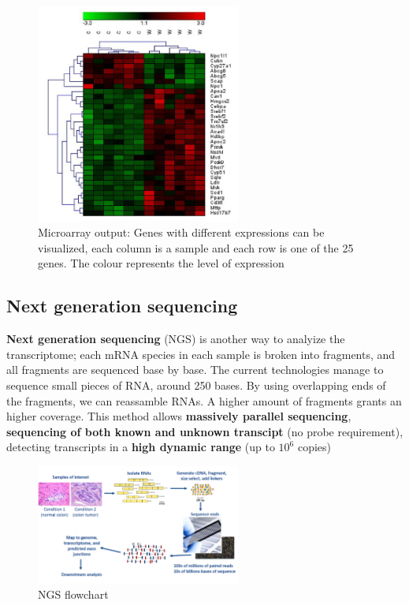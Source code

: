       \begin{figure}[h]
      \caption{Microarray output: Genes with different expressions can be visualized, each column is a sample and each row is one of the 25 genes. The colour represents the level of expression}
      \centering
      \includegraphics[width=0.6\textwidth]{MicroRNAresults.PNG}
      \end{figure}

    \subsection{Next generation sequencing}
      \textbf{Next generation sequencing} (NGS) is another way to analyize the transcriptome; each mRNA species in each sample is broken into fragments, and all fragments are sequenced base by base. The current technologies manage to sequence small pieces of RNA, around 250 bases. By using overlapping ends of the fragments, we can reassamble RNAs. A higher amount of fragments grants an higher coverage. This method allows \textbf{massively parallel sequencing}, \textbf{sequencing of both known and unknown transcipt} (no probe requirement), detecting transcripts in a \textbf{high dynamic range} (up to $10^6$ copies)

      \begin{figure}[h]
      \caption{NGS flowchart}
      \centering
      \includegraphics[width=0.6\textwidth]{TranscriptomicsNextGenSeq.PNG}
      \end{figure}

